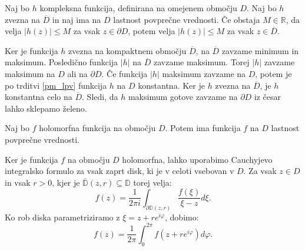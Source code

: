 \documentclass[mat1]{fmfdelo}
\begin{document}
    \begin{posledica}
        \label{posledica_pm_lpv}
        Naj bo $h$  kompleksna funkcija, definirana na omejenem območju $D$. Naj bo $h$ zvezna na $\overline{D}$ in naj ima na $D$ lastnost povprečne vrednosti. 
        Če obstaja $M \in \mathbb{R}$, da velja $|h(z)| \leq M$ za vsak $z \in \partial D$, potem velja $|h(z)| \leq M$ za vsak $z \in \overline{D}$. 
    \end{posledica}
    \begin{dokaz}
        Ker je funkcija $h$ zvezna na kompaktnem območju $\overline{D}$, na $\overline{D}$ zavzame minimum in maksimum. Posledično funkcija $|h|$ na $\overline{D}$ zavzame maksimum. 
        Torej $|h|$ zavzame maksimum na $D$ ali na $\partial D$. Če funkcija $|h|$ maksimum zavzame na $D$, potem je po trditvi \ref{pm_lpv} funkcija $h$ na $D$ konstantna. Ker je $h$ zvezna na $\overline{D}$, je $h$ konstantna celo na $\overline{D}$. 
        Sledi, da $h$ maksimum gotove zavzame na $\partial D$ iz česar lahko sklepamo želeno.
    \end{dokaz}

    \begin{trditev}
        Naj bo $f$ holomorfna funkcija na območju $D$. Potem ima funkcija $f$ na $D$ lastnost povprečne vrednosti.
    \end{trditev}
    \begin{dokaz}
        Ker je funkcija $f$ na območju $D$ holomorfna, lahko uporabimo Cauchyjevo integralsko formulo za vsak zaprt disk, ki je v celoti vsebovan v $D$. Za vsak $z \in D$ in vsak $r > 0$, kjer je $\overline{\mathbb{D}}(z,r) \subseteq \mathbb{D}$ torej velja:
        $$
        f(z) = \frac{1}{2 \pi i} \int_{\partial \mathbb{D}(z, r)}{\frac{f(\xi)}{\xi  - z}}d\xi.
        $$
        Ko rob diska parametriziramo z $\xi = z + r e^{i \varphi}$, dobimo:
        $$
        f(z) = \frac{1}{2 \pi} \int_{0}^{2\pi}{f(z + re^{i\varphi})}d\varphi.
        $$
    \end{dokaz}
\end{document}
